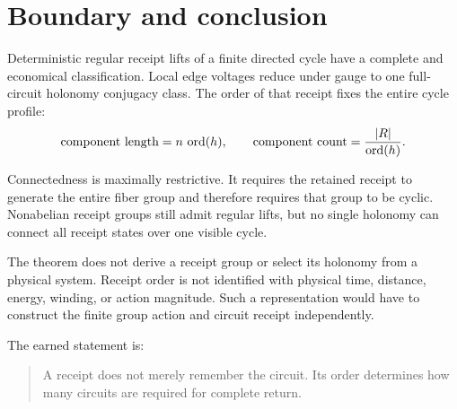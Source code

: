 \section{Boundary and conclusion}

Deterministic regular receipt lifts of a finite directed cycle have a complete
and economical classification. Local edge voltages reduce under gauge to one
full-circuit holonomy conjugacy class. The order of that receipt fixes the
entire cycle profile:
\[
\text{component length}=n\,\operatorname{ord}(h),
\qquad
\text{component count}=\frac{|R|}{\operatorname{ord}(h)}.
\]

Connectedness is maximally restrictive. It requires the retained receipt to
generate the entire fiber group and therefore requires that group to be
cyclic. Nonabelian receipt groups still admit regular lifts, but no single
holonomy can connect all receipt states over one visible cycle.

The theorem does not derive a receipt group or select its holonomy from a
physical system. Receipt order is not identified with physical time, distance,
energy, winding, or action magnitude. Such a representation would have to
construct the finite group action and circuit receipt independently.

The earned statement is:
\begin{quote}
A receipt does not merely remember the circuit. Its order determines how many
circuits are required for complete return.
\end{quote}

